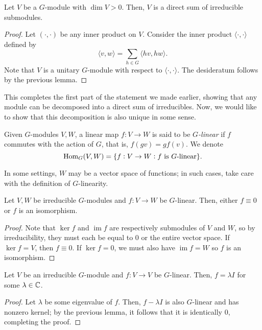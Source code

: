 	\begin{flem}
		Let $V$ be a $G$-module with $\dim V > 0$. Then, $V$ is a direct sum of irreducible submodules.
	\end{flem}
	\begin{proof}
		Let $(\cdot,\cdot)$ be any inner product on $V$. Consider the inner product $\langle \cdot,\cdot\rangle$ defined by
		\[ \langle v,w\rangle = \sum_{h \in G} \langle hv,hw\rangle. \]
		Note that $V$ is a unitary $G$-module with respect to $\langle \cdot,\cdot\rangle$. The desideratum follows by the previous lemma.
	\end{proof}

	This completes the first part of the statement we made earlier, showing that any module can be decomposed into a direct sum of irreducibles. Now, we would like to show that this decomposition is also unique in some sense.

	\begin{fdef}
		Given $G$-modules $V,W$, a linear map $f : V \to W$ is said to be \emph{$G$-linear} if $f$ commutes with the action of $G$, that is, $f(gv) = gf(v)$. We denote
		\[ \operatorname{Hom}_G(V,W) = \{ f : V \to W : f \text{ is $G$-linear} \}. \]
	\end{fdef}

	In some settings, $W$ may be a vector space of functions; in such cases, take care with the definition of $G$-linearity.

	\begin{flem}
		Let $V,W$ be irreducible $G$-modules and $f : V \to W$ be $G$-linear. Then, either $f \equiv 0$ or $f$ is an isomorphism.
	\end{flem}
	\begin{proof}
		Note that $\ker f$ and $\operatorname{im} f$ are respectively submodules of $V$ and $W$, so by irreducibility, they must each be equal to $0$ or the entire vector space. If $\ker f = V$, then $f \equiv 0$. If $\ker f = 0$, we must also have $\operatorname{im} f = W$ so $f$ is an isomorphism.
	\end{proof}

	\begin{flem}
		Let $V$ be an irreducible $G$-module and $f : V \to V$ be $G$-linear. Then, $f = \lambda I$ for some $\lambda \in \mathbb{C}$.
	\end{flem}
	\begin{proof}
		Let $\lambda$ be some eigenvalue of $f$. Then, $f - \lambda I$ is also $G$-linear and has nonzero kernel; by the previous lemma, it follows that it is identically $0$, completing the proof.
	\end{proof}

